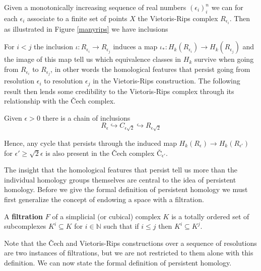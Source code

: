 Given a monotonically increasing sequence of real numbers $(\epsilon_{i})^{n}_{i}$ we can for each $\epsilon_{i}$ associate to a finite set of points $X$ the Vietoris-Rips complex $R_{\epsilon_{i}}$. Then as illustrated in Figure \ref{manyrips} we have inclusions
\begin{center}
\end{center}
For $i<j$ the inclusion $\iota: R_{\epsilon_i} \to R_{\epsilon_{j}}$ induces a map $\iota_{*}: H_{k}(R_{\epsilon_{i}}) \to H_{k}(R_{\epsilon_j})$ and the image of this map tell us which equivalence classes in $H_{k}$ survive when going from $R_{\epsilon_{i}}$ to $R_{\epsilon_{j}}$, in other words the homological features that persist going from resolution $\epsilon_{i}$ to resolution $\epsilon_{j}$ in the Vietoris-Rips construction. The following result then lends some credibility to the Vietoris-Rips complex through its relationship with the Čech complex.
\begin{lemma}
  Given $\epsilon > 0$ there is a chain of inclusions
  \[R_{\epsilon} \hookrightarrow C_{\epsilon \sqrt{2}} \hookrightarrow R_{\epsilon \sqrt{2}}\]
\end{lemma}
Hence, any cycle that persists through the induced map $H_{k}(R_{\epsilon}) \to H_{k}(R_{\epsilon'})$ for $\epsilon'  \geq \sqrt{2} \epsilon$ is also present in the Čech complex $\text{Č}_{\epsilon'}$.

The insight that the homological features that persist tell us more than the individual homology groups themselves are central to the idea of persistent homology. Before we give the formal definition of persistent homology we must first generalize the concept of endowing a space with a filtration.

\begin{definition}
A \textbf{filtration} $F$ of a simplicial (or cubical) complex $K$ is a totally ordered set of subcomplexes $K^{i}  \subseteq K$ for $i \in \mathbb{N}$ such that if $i \leq j$ then $K^{i} \subseteq K^{j}$.
\end{definition}

Note that the Čech and Vietoris-Rips constructions over a sequence of resolutions are two instances of filtrations, but we are not restricted to them alone with this definition. We can now state the formal definition of persistent homology.

